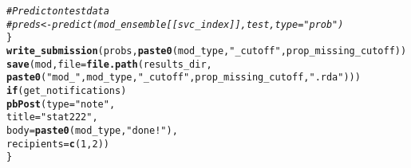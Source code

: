 \documentclass{article}\usepackage[]{graphicx}\usepackage[]{color}
\makeatletter
\newcommand{\hlnum}[1]{\textcolor[rgb]{0.686,0.059,0.569}{#1}}%
\newcommand{\hlstr}[1]{\textcolor[rgb]{0.192,0.494,0.8}{#1}}%
\newcommand{\hlcom}[1]{\textcolor[rgb]{0.678,0.584,0.686}{\textit{#1}}}%
\newcommand{\hlstd}[1]{\textcolor[rgb]{0.345,0.345,0.345}{#1}}%
\newcommand{\hlkwa}[1]{\textcolor[rgb]{0.161,0.373,0.58}{\textbf{#1}}}%
\newcommand{\hlkwc}[1]{\textcolor[rgb]{0.333,0.667,0.333}{#1}}%
\newcommand{\hlkwd}[1]{\textcolor[rgb]{0.737,0.353,0.396}{\textbf{#1}}}%
\newenvironment{kframe}{%
 \def\at@end@of@kframe{}%
 \ifinner\ifhmode%
  \def\at@end@of@kframe{\end{minipage}}%
  \begin{minipage}{\columnwidth}%
 \fi\fi%
 \def\FrameCommand##1{\hskip\@totalleftmargin \hskip-\fboxsep
 \colorbox{shadecolor}{##1}\hskip-\fboxsep
     \hskip-\linewidth \hskip-\@totalleftmargin \hskip\columnwidth}%
 \MakeFramed {\advance\hsize-\width
   \@totalleftmargin\z@ \linewidth\hsize
   \@setminipage}}%
 {\par\unskip\endMakeFramed%
 \at@end@of@kframe}
\newenvironment{knitrout}{}{} %
\makeatother
\begin{document}
\begin{knitrout}
\begin{kframe}
\begin{alltt}
    \hlcom{# Predict on test data}
    \hlcom{# preds <- predict(mod_ensemble[[svc_index]], test, type = "prob")}
  \hlstd{\}}
  \hlkwd{write_submission}\hlstd{(probs,} \hlkwd{paste0}\hlstd{(mod_type,} \hlstr{"_cutoff"}\hlstd{, prop_missing_cutoff))}
  \hlkwd{save}\hlstd{(mod,} \hlkwc{file} \hlstd{=} \hlkwd{file.path}\hlstd{(results_dir,}
                             \hlkwd{paste0}\hlstd{(}\hlstr{"mod_"}\hlstd{, mod_type,} \hlstr{"_cutoff"}\hlstd{, prop_missing_cutoff,} \hlstr{".rda"}\hlstd{)))}
  \hlkwa{if} \hlstd{(get_notifications)}
    \hlkwd{pbPost}\hlstd{(}\hlkwc{type} \hlstd{=} \hlstr{"note"}\hlstd{,}
           \hlkwc{title} \hlstd{=} \hlstr{"stat222"}\hlstd{,}
           \hlkwc{body} \hlstd{=} \hlkwd{paste0}\hlstd{(mod_type,} \hlstr{" done!"}\hlstd{),}
           \hlkwc{recipients} \hlstd{=} \hlkwd{c}\hlstd{(}\hlnum{1}\hlstd{,} \hlnum{2}\hlstd{))}
\hlstd{\}}
\end{alltt}
\end{kframe}
\end{knitrout}
\end{document}
